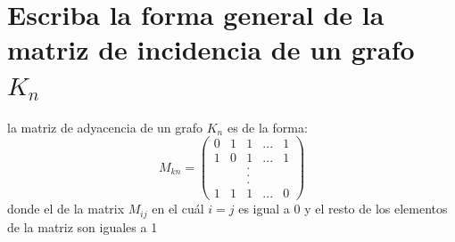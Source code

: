 \documentclass[10pt,a4paper]{article} %
\begin{document}
    \section{Escriba la forma general de la matriz de incidencia de un grafo $ K_n  $ }
        la matriz de adyacencia de un grafo $ K_n  $ es de la forma:
        \begin{equation}
            M_{kn} = \begin{pmatrix}
                0 & 1 & 1 & ... & 1
                \\ 1 & 0 & 1 & ... & 1
                \\ & & . & &
                \\ & & . & &
                \\ & & . & &
                \\1 & 1 & 1 & ... & 0
            \end{pmatrix}
        \end{equation}
        donde el de la matrix $ M_{ij}  $ en el cuál $ i=j  $ es igual a 0 y
        el resto de los elementos de la matriz son iguales a 1
























    \nocite{*}
    
    
\end{document}
